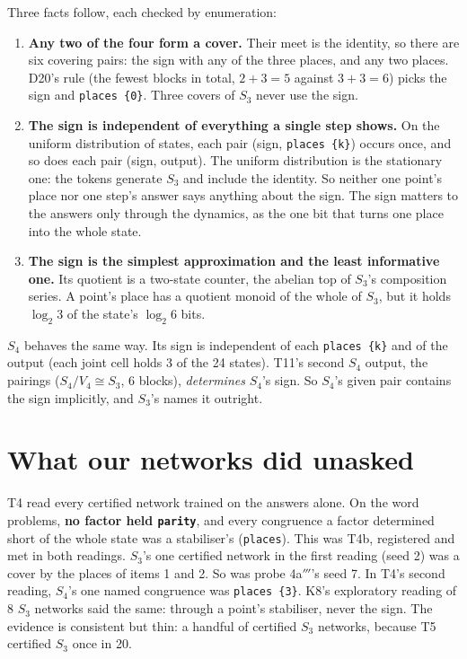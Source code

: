 \documentclass[11pt]{article}
\begin{document}
Three facts follow, each checked by enumeration:

\begin{enumerate}
\item \textbf{Any two of the four form a cover.} Their meet is the identity, so there are six covering
  pairs: the sign with any of the three places, and any two places. D20's rule (the fewest blocks in
  total, $2 + 3 = 5$ against $3 + 3 = 6$) picks the sign and \texttt{places \{0\}}. Three covers of
  $S_3$ never use the sign.
\item \textbf{The sign is independent of everything a single step shows.} On the uniform distribution
  of states, each pair (sign, \texttt{places \{k\}}) occurs once, and so does each pair (sign,
  output). The uniform distribution is the stationary one: the tokens generate $S_3$ and include the
  identity. So neither one point's place nor one step's answer says anything about the sign. The sign
  matters to the answers only through the dynamics, as the one bit that turns one place into the
  whole state.
\item \textbf{The sign is the simplest approximation and the least informative one.} Its quotient is a
  two-state counter, the abelian top of $S_3$'s composition series. A point's place has a quotient
  monoid of the whole of $S_3$, but it holds $\log_2 3$ of the state's $\log_2 6$ bits.
\end{enumerate}

$S_4$ behaves the same way. Its sign is independent of each \texttt{places \{k\}} and of the output
(each joint cell holds 3 of the 24 states). T11's second $S_4$ output, the pairings ($S_4 / V_4 \cong
S_3$, 6 blocks), \emph{determines} $S_4$'s sign. So $S_4$'s given pair contains the sign implicitly,
and $S_3$'s names it outright.

\section{What our networks did unasked}

T4 read every certified network trained on the answers alone. On the word problems, \textbf{no
factor held \texttt{parity}}, and every congruence a factor determined short of the whole state was a
stabiliser's (\texttt{places}). This was T4b, registered and met in both readings. $S_3$'s one
certified network in the first reading (seed 2) was a cover by the places of items 1 and 2. So was
probe 4a$'''$'s seed 7. In T4's second reading, $S_4$'s one named congruence was \texttt{places \{3\}}. K8's
exploratory reading of 8 $S_3$ networks said the same: through a point's stabiliser, never the sign.
The evidence is consistent but thin: a handful of certified $S_3$ networks, because T5 certified
$S_3$ once in 20.
\end{document}
